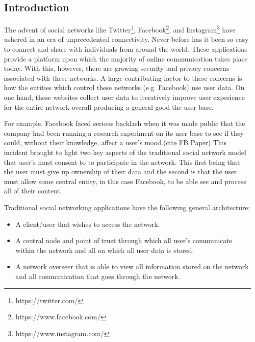 \documentclass[pageno]{jpaper}
\begin{document}
\begin{multicols*}{2}
\begin{abstract}
\end{abstract}


\section{Introduction}

The advent of social networks like Twitter\footnote{https://twitter.com/}, Facebook\footnote{https://www.facebook.com/}, and Instagram\footnote{https://www.instagram.com/} have ushered in an era of unprecedented connectivity. Never before has it been so easy to connect and share with individuals from around the world. These applications provide a platform upon which the majority of online communication takes place today. With this, however, there are growing security and privacy concerns associated with these networks. A large contributing factor to these concerns is how the entities which control these networks (e.g. Facebook) use user data. On one hand, these websites collect user data to iteratively improve user experience for the entire network overall producing a general good the user base.\par 
For example, Facebook faced serious backlash when it was made public that the company had been running a research experiment on its user base to see if they could, without their knowledge, affect a user’s mood.(cite FB Paper) This incident brought to light two key aspects of the traditional social network model that user’s must consent to to participate in the network. This first being that the user must give up ownership of their data and the second is that the user must allow some central entity, in this case Facebook, to be able see and process all of their content.\par
Traditional social networking applications have the following general architecture:\newline

\begin{center}
	\begin{itemize}
		\setlength{\itemsep}{2\baselineskip}
		\item A client/user that wishes to access the network.\\
		\item A central node and point of trust through which all user’s communicate within the network and all on which all user data is stored.\\
		\item A network overseer that is able to view all information stored on the network and all communication that goes through the network.\newline
	\end{itemize}
\end{center}


\end{multicols*}
\end{document}
